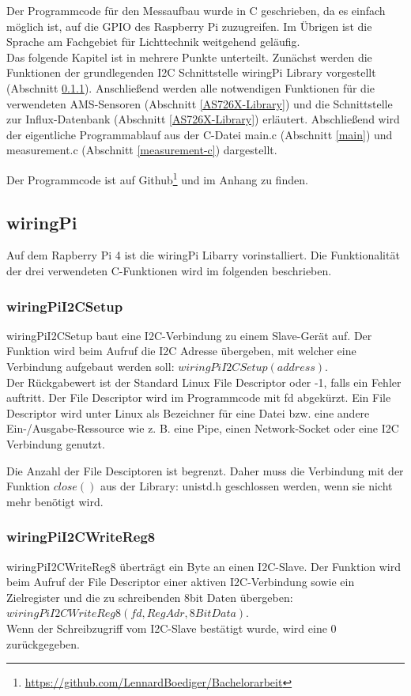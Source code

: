 Der Programmcode für den Messaufbau wurde in C geschrieben, da es einfach möglich ist, auf die GPIO des Raspberry Pi zuzugreifen. Im Übrigen ist die Sprache am Fachgebiet für Lichttechnik weitgehend geläufig.\\
Das folgende Kapitel ist in mehrere Punkte unterteilt. Zunächst werden die Funktionen der grundlegenden I2C Schnittstelle wiringPi Library vorgestellt (Abschnitt \ref{wiringPiI2CSetup}). Anschließend werden alle notwendigen Funktionen für die verwendeten AMS-Sensoren (Abschnitt \ref{AS726X-Library}) und die Schnittstelle zur Influx-Datenbank (Abschnitt \ref{AS726X-Library}) erläutert.
Abschließend wird der eigentliche Programmablauf aus der C-Datei main.c (Abschnitt \ref{main}) und measurement.c (Abschnitt \ref{measurement-c}) dargestellt.

\noindent Der Programmcode ist auf Github\footnote{\url{https://github.com/LennardBoediger/Bachelorarbeit}} und im Anhang zu finden.


\subsection{wiringPi}
Auf dem Rapberry Pi 4 ist die  wiringPi Libarry vorinstalliert. 
Die Funktionalität der drei verwendeten C-Funktionen wird im folgenden beschrieben.

\subsubsection{wiringPiI2CSetup}\label{wiringPiI2CSetup}
wiringPiI2CSetup baut eine I2C-Verbindung zu einem Slave-Gerät auf.
Der Funktion wird beim Aufruf die I2C Adresse übergeben, mit welcher eine Verbindung aufgebaut werden soll: $wiringPiI2CSetup(address)$.\\
Der Rückgabewert ist der Standard Linux File Descriptor oder -1, falls ein Fehler auftritt. 
Der File Descriptor wird im Programmcode mit fd abgekürzt.
Ein File Descriptor wird unter Linux als Bezeichner für eine Datei bzw. eine andere Ein-/Ausgabe-Ressource wie z. B. eine Pipe, einen Network-Socket oder eine I2C Verbindung genutzt.

Die Anzahl der File Desciptoren ist begrenzt. Daher muss die Verbindung mit der Funktion $close()$ aus der Library: unistd.h geschlossen werden, wenn sie nicht mehr benötigt wird.

\subsubsection{wiringPiI2CWriteReg8}
wiringPiI2CWriteReg8 überträgt ein Byte an einen I2C-Slave.
Der Funktion wird beim Aufruf der File Descriptor einer aktiven I2C-Verbindung sowie ein Zielregister und die zu schreibenden 8bit Daten übergeben:\\ $wiringPiI2CWriteReg8 (fd, RegAdr, 8BitData)$.\\
Wenn der Schreibzugriff vom I2C-Slave bestätigt wurde, wird eine 0 zurückgegeben.

